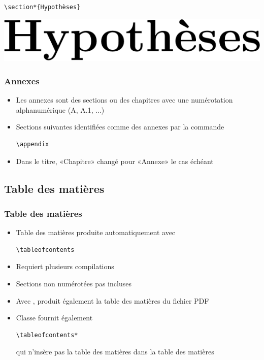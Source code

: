 \begin{frame}[fragile=singleslide]
\begin{itemize}
\begin{demo}
\begin{minipage}{0.45\linewidth}
\begin{lstlisting}
\section*{Hypothèses}
\end{lstlisting}
      \end{minipage}
      \hfill
      \begin{minipage}{0.45\linewidth}
        \includegraphics[height=0.8\baselineskip,keepaspectratio]{section-non-num}
      \end{minipage}
    \end{demo}
  \end{itemize}
\end{frame}

\begin{frame}[fragile=singleslide]
  \frametitle{Annexes}
  \begin{itemize}
  \item Les annexes sont des sections ou des chapitres avec une numérotation
    alphanumérique (A, A.1, ...)
  \item Sections suivantes identifiées comme des annexes par la
    commande
\begin{lstlisting}
\appendix
\end{lstlisting}
  \item Dans le titre, «Chapitre» changé pour «Annexe» le cas échéant
  \end{itemize}
\end{frame}

\subsection{Table des matières}

\begin{frame}[fragile=singleslide]
  \frametitle{Table des matières}
  \begin{itemize}
  \item Table des matières produite automatiquement avec
\begin{lstlisting}
\tableofcontents
\end{lstlisting}
  \item Requiert plusieurs compilations
  \item Sections non numérotées pas incluses
  \item Avec , produit également la table des
    matières du fichier PDF
  \item Classe  fournit également
\begin{lstlisting}
\tableofcontents*
\end{lstlisting}
    qui n'insère pas la table des matières dans la table des matières
  \end{itemize}
\end{frame}

